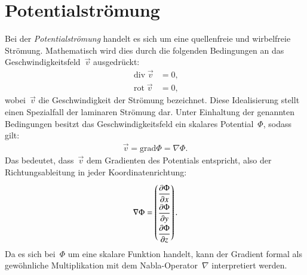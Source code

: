%
%
%
%
\section{Potentialströmung\label{ueberschall:section:potentialstroemung}}
Bei der \emph{Potentialströmung} handelt es sich um eine 
%
quellenfreie und wirbelfreie Strömung.
Mathematisch wird dies durch die folgenden Bedingungen 
an das Geschwindigkeitsfeld~$\vec{v}$ ausgedrückt:
\begin{align*}
    \operatorname{div} \vec{v} &= 0, \\
    \operatorname{rot} \vec{v} &= 0,
\end{align*}
wobei~$\vec{v}$ die Geschwindigkeit der Strömung bezeichnet.
Diese Idealisierung stellt einen Spezialfall der
laminaren Strömung dar. 
Unter Einhaltung der genannten Bedingungen 
besitzt das Geschwindigkeitsfeld ein skalares
Potential~$\Phi$, sodass gilt:
\begin{align}
    \vec{v} 
    = 
    \mathrm{grad} \Phi 
    = 
    \nabla \Phi.\label{eq:potential}
\end{align}
Das bedeutet, dass~$\vec{v}$ dem Gradienten des Potentials 
entspricht, also der Richtungsableitung in jeder 
Koordinatenrichtung:
\begin{align*}
    \nabla \Phi =
\renewcommand{\arraystretch}{1.9}
    \begin{pmatrix}
        \displaystyle\frac{\partial \Phi}{\partial x} \\
        \displaystyle\frac{\partial \Phi}{\partial y} \\
        \displaystyle\frac{\partial \Phi}{\partial z}
    \end{pmatrix}.
\end{align*}
Da es sich bei~$\Phi$ um eine skalare Funktion handelt, 
kann der Gradient formal als gewöhnliche Multiplikation 
mit dem Nabla-Operator~$\nabla$ interpretiert werden.

